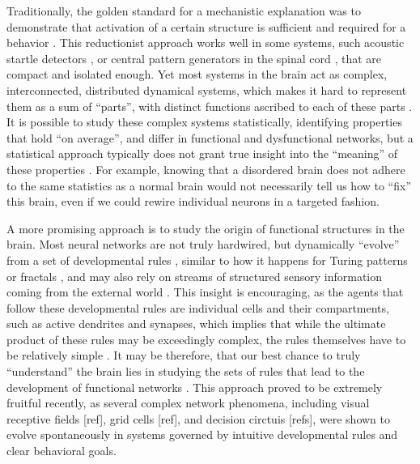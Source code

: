 \documentclass{article}
\begin{document}
Traditionally, the golden standard for a mechanistic explanation was to demonstrate that activation of a certain structure is sufficient and required for a behavior \citep{krakauer2017reductionist}. This reductionist approach works well in some systems, such acoustic startle detectors \citep{korn2005mauthner}, or central pattern generators in the spinal cord \citep{roberts2010hatchling}, that are compact and isolated enough. Yet most systems in the brain act as complex, interconnected, distributed dynamical systems, which makes it hard to represent them as a sum of “parts”, with distinct functions ascribed to each of these parts \citep{gao2015simplicity}. It is possible to study these complex systems statistically, identifying properties that hold “on average”, and differ in functional and dysfunctional networks, but a statistical approach typically does not grant true insight into the “meaning” of these properties \citep{bassett2018models}. For example, knowing that a disordered brain does not adhere to the same statistics as a normal brain would not necessarily tell us how to “fix” this brain, even if we could rewire individual neurons in a targeted fashion.

A more promising approach is to study the origin of functional structures in the brain. Most neural networks are not truly hardwired, but dynamically “evolve” from a set of developmental rules \citep{pietri2017emergence}, similar to how it happens for Turing patterns or fractals \citep{lefevre2010reaction,bullmore2012economy}, and may also rely on streams of structured sensory information coming from the external world \citep{gao2015simplicity}. This insight is encouraging, as the agents that follow these developmental rules are individual cells and their compartments, such as active dendrites and synapses, which implies that while the ultimate product of these rules may be exceedingly complex, the rules themselves have to be relatively simple \citep{bassett2018models}. It may be therefore, that our best chance to truly “understand” the brain lies in studying the sets of rules that lead to the development of functional networks \citep{linderman2017constrain}. This approach proved to be extremely fruitful recently, as several complex network phenomena, including visual receptive fields [ref], grid cells [ref], and decision circtuis [refs]\citep{haesemeyer2018convergent}, were shown to evolve spontaneously in systems governed by intuitive developmental rules and clear behavioral goals. 
\end{document}

